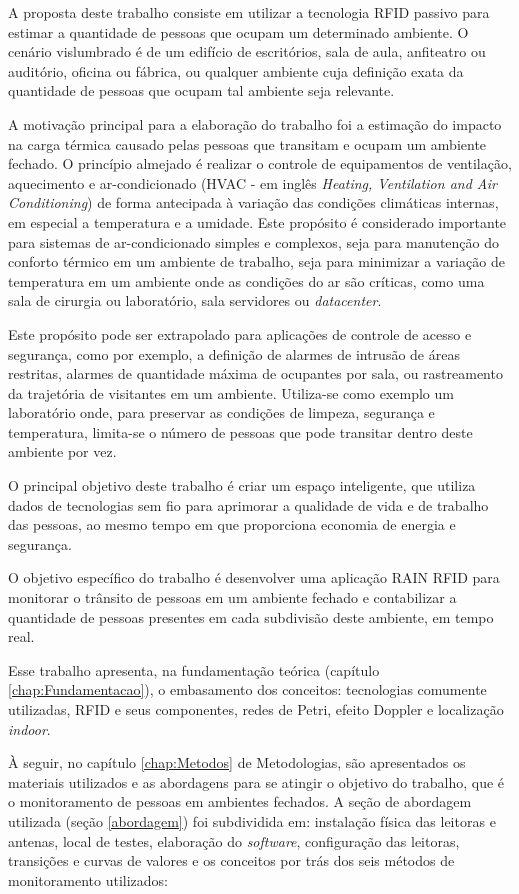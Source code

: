 A proposta deste trabalho consiste em utilizar a tecnologia RFID passivo para estimar a quantidade de pessoas que ocupam um determinado ambiente. O cenário vislumbrado é de um edifício de escritórios, sala de aula, anfiteatro ou auditório, oficina ou fábrica, ou qualquer ambiente cuja definição exata da quantidade de pessoas que ocupam tal ambiente seja relevante.

A motivação principal para a elaboração do trabalho foi a estimação do impacto na carga térmica causado pelas pessoas que transitam e ocupam um ambiente fechado. O princípio almejado é realizar o controle de equipamentos de ventilação, aquecimento e ar-condicionado (HVAC - em inglês \textit{Heating, Ventilation and Air Conditioning}) de forma antecipada à variação das condições climáticas internas, em especial a temperatura e a umidade. Este propósito é considerado importante para sistemas de ar-condicionado simples e complexos, seja para manutenção do conforto térmico em um ambiente de trabalho, seja para minimizar a variação de temperatura em um ambiente onde as condições do ar são críticas, como uma sala de cirurgia ou laboratório, sala servidores ou \textit{datacenter}.

Este propósito pode ser extrapolado para aplicações de controle de acesso e segurança, como por exemplo, a definição de alarmes de intrusão de áreas restritas, alarmes de quantidade máxima de ocupantes por sala, ou rastreamento da trajetória de visitantes em um ambiente. Utiliza-se como exemplo um laboratório onde, para preservar as condições de limpeza, segurança e temperatura, limita-se o número de pessoas que pode transitar dentro deste ambiente por vez.

O principal objetivo deste trabalho é criar um espaço inteligente, que utiliza dados de tecnologias sem fio para aprimorar a qualidade de vida e de trabalho das pessoas, ao mesmo tempo em que proporciona economia de energia e segurança.

O objetivo específico do trabalho é desenvolver uma aplicação RAIN RFID para monitorar o trânsito de pessoas em um ambiente fechado e contabilizar a quantidade de pessoas presentes em cada subdivisão deste ambiente, em tempo real.

Esse trabalho apresenta, na fundamentação teórica (capítulo \ref{chap:Fundamentacao}), o embasamento dos conceitos: tecnologias comumente utilizadas, RFID e seus componentes, redes de Petri, efeito Doppler e localização \textit{indoor}.

À seguir, no capítulo \ref{chap:Metodos} de Metodologias, são apresentados os materiais utilizados e as abordagens para se atingir o objetivo do trabalho, que é o monitoramento de pessoas em ambientes fechados. A seção de abordagem utilizada (seção \ref{abordagem}) foi subdividida em: instalação física das leitoras e antenas, local de testes, elaboração do \textit{software}, configuração das leitoras, transições e curvas de valores e os conceitos por trás dos seis métodos de monitoramento utilizados:

